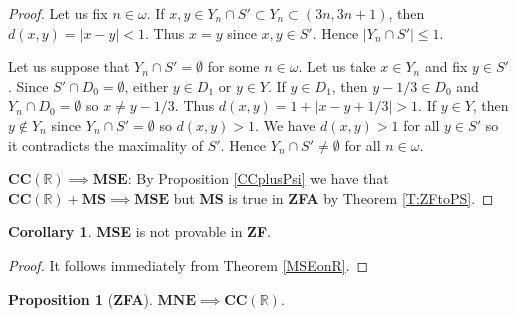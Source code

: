 \documentclass[11pt, reqno]{amsart}
\theoremstyle{definition}
\numberwithin{theorem}{section}
\theoremstyle{definition}
\theoremstyle{definition}
\theoremstyle{definition}
\theoremstyle{definition}
\theoremstyle{definition}
\numberwithin{claim}{section}
\theoremstyle{definition}
\newtheorem{proposition}[theorem]{Proposition}
\theoremstyle{definition}
\newtheorem{corollary}[theorem]{Corollary}
\theoremstyle{definition}
\theoremstyle{definition}
\theoremstyle{definition}
\theoremstyle{remboldstyle}
\begin{document}
\begin{proof}
Let us fix $n \in \omega$. If $x, y \in Y_n \cap S' \subset Y_n \subset (3n, 3n + 1)$, then $d(x, y) = |x - y| < 1$. Thus $x = y$ since $x, y \in S'$. Hence $|Y_n \cap S'| \le 1$.

Let us suppose that $Y_n \cap S' = \emptyset$ for some $n \in \omega$. Let us take $x \in Y_n$ and fix $y \in S'$. Since $S' \cap D_0 = \emptyset$, either $y \in D_1$ or $y \in Y$. If $y \in D_1$, then $y - 1/3 \in D_0$ and $Y_n \cap D_0 = \emptyset$ so $x \neq y - 1/3$. Thus $d(x, y) = 1 + |x - y + 1/3| > 1$. If $y \in Y$, then $y \not\in Y_n$ since $Y_n \cap S' = \emptyset$ so $d(x, y) > 1$. We have $d(x, y) > 1$ for all $y \in S'$ so it contradicts the maximality of $S'$. Hence $Y_n \cap S' \neq \emptyset$ for all $n \in \omega$.

$\textbf{CC}(\mathbb{R}) \implies \mathbf{MSE}$: By Proposition \ref{CCplusPsi} we have that $\textbf{CC}(\mathbb{R}) + \textbf{MS} \implies \mathbf{MSE}$ but \textbf{MS} is true in \textbf{ZFA} by  Theorem \ref{T:ZFtoPS}.
\end{proof}


\begin{corollary}\label{MSEonRcor}
\textbf{MSE} is not provable in \textbf{ZF}.
\end{corollary}

\begin{proof}
    It follows immediately from Theorem \ref{MSEonR}.
\end{proof}

\begin{proposition}[\textbf{ZFA}]\label{MNEimpliesCCR}
$\textbf{MNE} \implies \textbf{CC}(\mathbb{R})$. 
\end{proposition}
\end{document}
